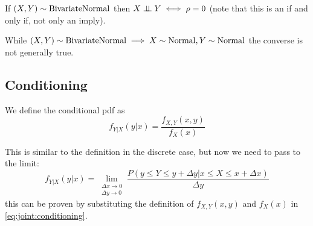 \documentclass[12pt]{extarticle}
\newcommand{\Normal}{{\operatorfont Normal}}
\newcommand{\BivariateNormal}{{\operatorfont BivariateNormal}}
\begin{document}
\begin{remark}
    If $(X, Y) \sim \BivariateNormal$ then $X \perp \!\!\! \perp Y \iff \rho = 0$ (note that this is an if and only if, not only an imply).
\end{remark}

\begin{remark}
    While $(X, Y) \sim \BivariateNormal \implies X \sim \Normal, Y \sim \Normal$ the converse is not generally true.
\end{remark}

\subsection{Conditioning}

\begin{definition}
    We define the conditional pdf as
    \begin{equation}
        f_{Y | X}(y | x) = \frac{f_{X, Y}(x, y)}{f_X(x)} \label{eq:joint:conditioning}
    \end{equation}
\end{definition}

This is similar to the definition in the discrete case, but now we need to pass to the limit:
\begin{equation}
    f_{Y|X}(y|x) = \lim_{\substack{\Delta x \to 0 \\ \Delta y \to 0}} \frac{P\left(y \leq Y \leq y + \Delta y \big| x \leq X \leq x + \Delta x\right)}{\Delta y}
\end{equation}
this can be proven by substituting the definition of $f_{X, Y}(x,y)$ and $f_X(x)$ in \autoref{eq:joint:conditioning}.
\end{document}
